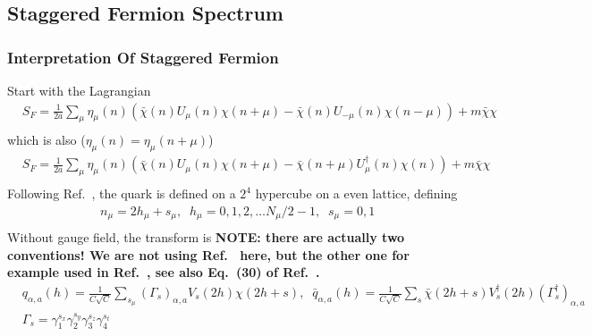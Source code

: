 \subsection{\label{StaggeredFermionSpectrum}Staggered Fermion Spectrum}

\subsubsection{\label{InterpretationOfStaggeredFermion}Interpretation Of Staggered Fermion}

Start with the Lagrangian
\begin{equation}
\begin{split}
&S_F=\frac{1}{2a}\sum _{\mu}\eta _{\mu}(n)\left(\bar{\chi} (n)U_{\mu}(n) \chi(n+\mu) - \bar{\chi}(n) U_{-\mu}(n)\chi(n-\mu)\right)+m\bar{\chi}\chi\\
\end{split}
\end{equation}
which is also ($\eta _{\mu}(n)=\eta _{\mu}(n+\mu)$)
\begin{equation}
\begin{split}
&S_F=\frac{1}{2a}\sum _{\mu}\eta _{\mu}(n)\left(\bar{\chi} (n)U_{\mu}(n) \chi(n+\mu) - \bar{\chi}(n+\mu) U_{\mu}^{\dagger}(n)\chi(n)\right)+m\bar{\chi}\chi\\
\end{split}
\end{equation}
Following Ref.~\cite{staggeredQuarks}, the quark is defined on a $2^4$ hypercube on a even lattice, defining
\begin{equation}
\begin{split}
&n_{\mu}=2h_{\mu}+s_{\mu},\;\;h_{\mu}=0,1,2,\ldots N_{\mu}/2-1,\;\;s_{\mu}=0,1\\
\end{split}
\end{equation}
Without gauge field, the transform is \textbf{\textcolor[rgb]{1,0,0}{NOTE: there are actually two conventions! We are not using Ref.~\cite{staggeredQuarks} here, but the other one for example used in Ref.~\cite{staggeredQuarks2}, see also Eq.~(30) of Ref.~\cite{MILC2009}.}}
\begin{equation}
\begin{split}
&q_{\alpha,a}(h)=\frac{1}{C\sqrt{C}}\sum _{s_{\mu}} (\Gamma _{s})_{\alpha,a}V_{s}(2h)\chi (2h+s),\;\;\bar{q}_{\alpha,a}(h)=\frac{1}{C\sqrt{C}}\sum _{s} \bar{\chi} (2h+s)V^{\dagger}_{s}(2h)(\Gamma _{s}^{\dagger})_{\alpha,a}\\
&\Gamma _{s}=\gamma _1^{s_x}\gamma _2^{s_y}\gamma _3^{s_z}\gamma _4^{s_t}\\
\end{split}
\end{equation}
